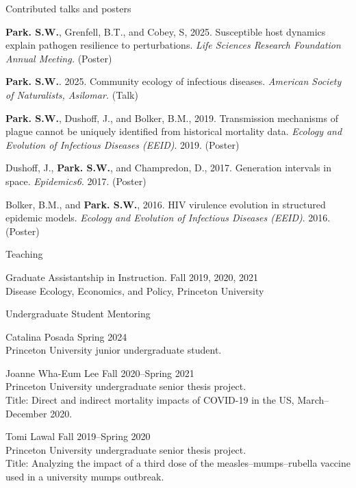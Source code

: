 \documentclass[
	11pt, %
]{resume} %
\begin{document}
\begin{rSection}{Contributed talks and posters}

\textbf{Park. S.W.}, Grenfell, B.T., and Cobey, S, 2025. Susceptible host dynamics explain pathogen resilience to perturbations. \textit{Life Sciences Research Foundation Annual Meeting.} (Poster)

\textbf{Park. S.W.}. 2025. Community ecology of infectious diseases. \textit{American Society of Naturalists, Asilomar.} (Talk)

\textbf{Park. S.W.}, Dushoff, J., and Bolker, B.M., 2019. Transmission mechanisms of plague cannot be uniquely identified from historical mortality data. \textit{Ecology and Evolution of Infectious Diseases (EEID)}. 2019. (Poster)

Dushoff, J., \textbf{Park. S.W.}, and Champredon, D., 2017. Generation intervals in space. \textit{Epidemics6}. 2017. (Poster)

Bolker, B.M., and \textbf{Park. S.W.}, 2016. HIV virulence evolution in structured epidemic models. \textit{Ecology and Evolution of Infectious Diseases (EEID)}. 2016. (Poster)

\end{rSection}


\begin{rSection}{Teaching}

Graduate Assistantship in Instruction. \hfill Fall 2019, 2020, 2021\\
Disease Ecology, Economics, and Policy, Princeton University

\end{rSection}

\begin{rSection}{Undergraduate Student Mentoring}

Catalina Posada \hfill Spring 2024\\
Princeton University junior undergraduate student.

Joanne Wha-Eum Lee \hfill Fall 2020--Spring 2021 \\
Princeton University undergraduate senior thesis project.\\
Title: Direct and indirect mortality impacts of COVID-19 in the US, March--December 2020.

Tomi Lawal \hfill Fall 2019--Spring 2020\\
Princeton University undergraduate senior thesis project.\\
Title: Analyzing the impact of a third dose of the measles--mumps--rubella vaccine used in a university mumps outbreak.

\end{rSection}
\end{document}
